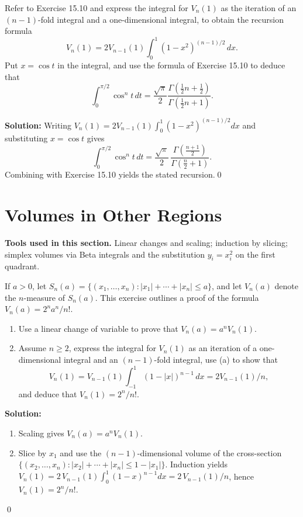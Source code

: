 \begin{problembox}
Refer to Exercise 15.10 and express the integral for \( V_n(1) \) as the iteration of an \( (n - 1) \)-fold integral and a one-dimensional integral, to obtain the recursion formula
\[
V_n(1) = 2V_{n-1}(1) \int_0^1 (1 - x^2)^{(n-1)/2} \, dx.
\]
Put \( x = \cos t \) in the integral, and use the formula of Exercise 15.10 to deduce that
\[
\int_0^{\pi/2} \cos^n t \, dt = \frac{\sqrt{\pi}}{2} \frac{\Gamma(\frac{1}{2}n + \frac{1}{2})}{\Gamma(\frac{1}{2}n + 1)}.
\]
\end{problembox}

\noindent\textbf{Solution:}
Writing \(V_n(1)=2V_{n-1}(1)\int_0^1 (1-x^2)^{(n-1)/2}dx\) and substituting \(x=\cos t\) gives
\[
\int_0^{\pi/2} \cos^n t\,dt = \frac{\sqrt{\pi}}{2}\,\frac{\Gamma(\tfrac{n+1}{2})}{\Gamma(\tfrac{n}{2}+1)}.
\]
Combining with Exercise 15.10 yields the stated recursion.\qed
\section{Volumes in Other Regions}

\noindent\textbf{Tools used in this section.} Linear changes and scaling; induction by slicing; simplex volumes via Beta integrals and the substitution \(y_i=x_i^2\) on the first quadrant.



\begin{problembox}
If \( a > 0 \), let \( S_n(a) = \{(x_1, \ldots, x_n): |x_1| + \cdots + |x_n| \leq a\} \), and let \( V_n(a) \) denote the \( n \)-measure of \( S_n(a) \). This exercise outlines a proof of the formula \( V_n(a) = 2^n a^n / n! \).
\begin{enumerate}[label=(\alph*)]
\item Use a linear change of variable to prove that \( V_n(a) = a^n V_n(1) \).
\item Assume \( n \geq 2 \), express the integral for \( V_n(1) \) as an iteration of a one-dimensional integral and an \( (n - 1) \)-fold integral, use (a) to show that
\[
V_n(1) = V_{n-1}(1) \int_{-1}^1 (1 - |x|)^{n-1} \, dx = 2V_{n-1}(1)/n,
\]
and deduce that \( V_n(1) = 2^n / n! \).
\end{enumerate}
\end{problembox}

\noindent\textbf{Solution:}
\begin{enumerate}[label=(\alph*)]
\item Scaling gives \(V_n(a)=a^n V_n(1)\).
\item Slice by \(x_1\) and use the \((n-1)\)-dimensional volume of the cross-section \(\{(x_2,\ldots,x_n): |x_2|+\cdots+|x_n|\le 1-|x_1|\}\). Induction yields
\(V_n(1)=2\,V_{n-1}(1)\int_0^1 (1-x)^{n-1}dx=2\,V_{n-1}(1)/n\), hence \(V_n(1)=2^n/n!\).
\end{enumerate}\qed


